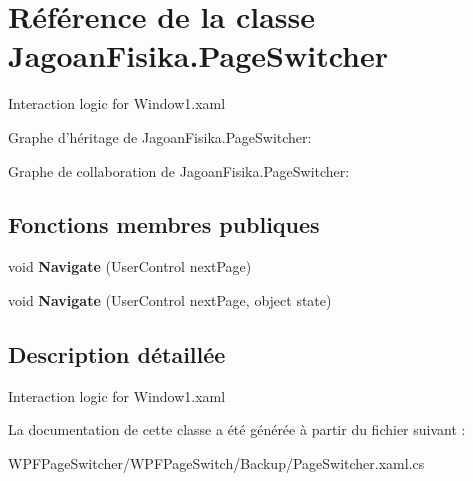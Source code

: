 \hypertarget{class_jagoan_fisika_1_1_page_switcher}{\section{Référence de la classe Jagoan\+Fisika.\+Page\+Switcher}
\label{class_jagoan_fisika_1_1_page_switcher}
}


Interaction logic for Window1.\+xaml  




Graphe d'héritage de Jagoan\+Fisika.\+Page\+Switcher\+:


Graphe de collaboration de Jagoan\+Fisika.\+Page\+Switcher\+:
\subsection*{Fonctions membres publiques}
\begin{DoxyCompactItemize}
\item 
\hypertarget{class_jagoan_fisika_1_1_page_switcher_a70d07b5901605d3f5becb63be932b694}{void {\bfseries Navigate} (User\+Control next\+Page)}\label{class_jagoan_fisika_1_1_page_switcher_a70d07b5901605d3f5becb63be932b694}

\item 
\hypertarget{class_jagoan_fisika_1_1_page_switcher_aad4415adad3ac0d5666bd10eb99fc784}{void {\bfseries Navigate} (User\+Control next\+Page, object state)}\label{class_jagoan_fisika_1_1_page_switcher_aad4415adad3ac0d5666bd10eb99fc784}

\end{DoxyCompactItemize}


\subsection{Description détaillée}
Interaction logic for Window1.\+xaml 



La documentation de cette classe a été générée à partir du fichier suivant \+:\begin{DoxyCompactItemize}
\item 
W\+P\+F\+Page\+Switcher/\+W\+P\+F\+Page\+Switch/\+Backup/Page\+Switcher.\+xaml.\+cs\end{DoxyCompactItemize}
